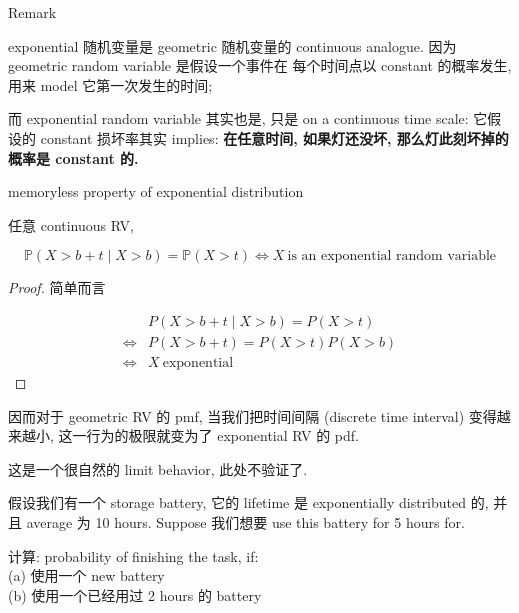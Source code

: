 \documentclass{qlnotes-export}
\begin{document}
\begin{qlremark}{Remark}

exponential 随机变量是 geometric 随机变量的 continuous analogue. 因为 geometric random variable 是假设一个事件在 每个时间点以 constant 的概率发生, 用来 model 它第一次发生的时间;

而 exponential random variable 其实也是, 只是 on a continuous time scale: 它假设的 constant 损坏率其实 implies: \textbf{在任意时间, 如果灯还没坏, 那么灯此刻坏掉的概率是 constant 的.}

\begin{theorem}{memoryless property of exponential distribution}\label{thm-02-random-variables-memoryless-property-of-exponential-distribution}

任意 continuous RV,

\[{\mathbb{P}}(X > b + t \mid X > b) = {\mathbb{P}}(X > t)\Leftrightarrow X\ \text{is an exponential random variable}\]

\end{theorem}

\begin{proof}

简单而言

\[\begin{matrix}
 & {P(X > b + t \mid X > b) = P(X > t)} \\
\Leftrightarrow & {P(X > b + t) = P(X > t)P(X > b)} \\
\Leftrightarrow & {X\ \text{exponential}}
\end{matrix}\]

\end{proof}

因而对于 geometric RV 的 pmf, 当我们把时间间隔 (discrete time interval) 变得越来越小, 这一行为的极限就变为了 exponential RV 的 pdf.

这是一个很自然的 limit behavior, 此处不验证了.

\end{qlremark}

\begin{example}\label{ex-02-random-variables-example-011}

假设我们有一个 storage battery, 它的 lifetime 是 exponentially distributed 的, 并且 average 为 10 hours. Suppose 我们想要 use this battery for 5 hours for.

计算: probability of finishing the task, if:\\
(a) 使用一个 new battery\\
(b) 使用一个已经用过 2 hours 的 battery\\

\end{example}
\end{document}
